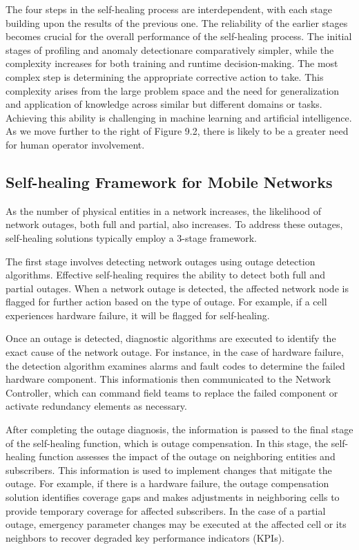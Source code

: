 The four steps in the self-healing process are interdependent, with each stage building upon the results of the previous one. The reliability of the earlier stages becomes crucial for the overall performance of the self-healing process. The initial stages of profiling and anomaly detectionare comparatively simpler, while the complexity increases for both training and runtime decision-making. The most complex step is determining the appropriate corrective action to take. This complexity arises from the large problem space and the need for generalization and application of knowledge across similar but different domains or tasks. Achieving this ability is challenging in machine learning and artificial intelligence. As we move further to the right of Figure 9.2, there is likely to be a greater need for human operator involvement.


\subsection{Self-healing Framework for Mobile Networks}

As the number of physical entities in a network increases, the likelihood of network outages, both full and partial, also increases. To address these outages, self-healing solutions typically employ a 3-stage framework.

The first stage involves detecting network outages using outage detection algorithms. Effective self-healing requires the ability to detect both full and partial outages. When a network outage is detected, the affected network node is flagged for further action based on the type of outage. For example, if a cell experiences hardware failure, it will be flagged for self-healing.

Once an outage is detected, diagnostic algorithms are executed to identify the exact cause of the network outage. For instance, in the case of hardware failure, the detection algorithm examines alarms and fault codes to determine the failed hardware component. This informationis then communicated to the Network Controller, which can command field teams to replace the failed component or activate redundancy elements as necessary.

After completing the outage diagnosis, the information is passed to the final stage of the self-healing function, which is outage compensation. In this stage, the self-healing function assesses the impact of the outage on neighboring entities and subscribers. This information is used to implement changes that mitigate the outage. For example, if there is a hardware failure, the outage compensation solution identifies coverage gaps and makes adjustments in neighboring cells to provide temporary coverage for affected subscribers. In the case of a partial outage, emergency parameter changes may be executed at the affected cell or its neighbors to recover degraded key performance indicators (KPIs).

